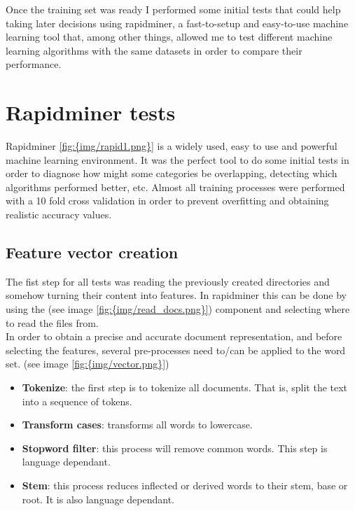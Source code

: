 Once the training set was ready I performed some initial tests that could help taking later decisions using rapidminer\cite{rapidminer}, a fast-to-setup and easy-to-use machine learning tool that, 
among other things, allowed me to test different machine learning algorithms with the same datasets in order to compare their performance. 

  

\section{Rapidminer tests}
Rapidminer\cite{rapidminer} \ref{fig:{img/rapid1.png}} is a widely used, easy to use and powerful machine learning environment.  
It was the perfect tool to do some initial tests in order to diagnose how might some categories be overlapping, detecting which algorithms performed better, etc. Almost all training processes were 
performed with a 10 fold cross validation in order to prevent overfitting and obtaining realistic accuracy values.

\subsection{Feature vector creation}
The fist step for all tests was reading the previously created directories and somehow turning their content into features. In rapidminer this can be done by using the 
 (see image \ref{fig:{img/read_docs.png}})
component and selecting where to read the files from.\\
In order to obtain a precise and accurate document representation, and before selecting the features, several pre-processes need to/can be applied to the word set. (see image \ref{fig:{img/vector.png}})
\begin{itemize}
  \item {\bf Tokenize}: the first step is to tokenize all documents. That is, split the text into a sequence of tokens. 
  \item {\bf Transform cases}: transforms all words to lowercase.
  \item {\bf Stopword filter}: this process will remove common words. This step is language dependant.
  \item {\bf Stem}: this process reduces inflected or derived words to their stem, base or root. It is also language dependant.
\end{itemize}


